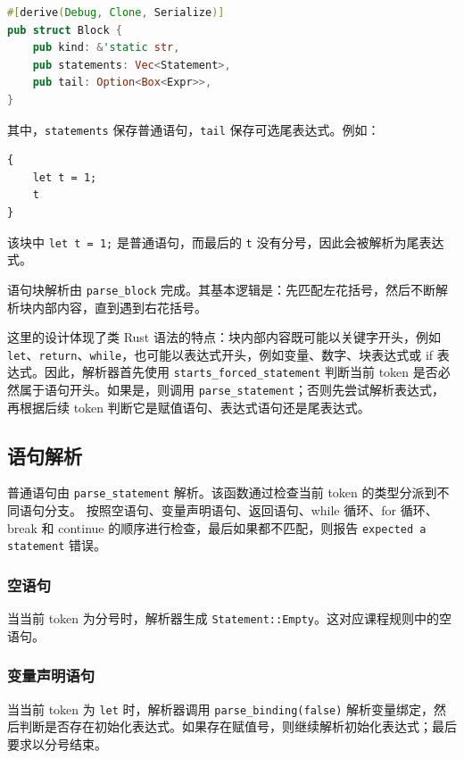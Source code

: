 \documentclass[UTF8,a4paper,12pt]{ctexart}
\begin{document}
\begin{lstlisting}[language=Rust,caption={Block 节点定义}]
#[derive(Debug, Clone, Serialize)]
pub struct Block {
    pub kind: &'static str,
    pub statements: Vec<Statement>,
    pub tail: Option<Box<Expr>>,
}
\end{lstlisting}

其中，\texttt{statements} 保存普通语句，\texttt{tail} 保存可选尾表达式。例如：

\begin{lstlisting}[caption={带尾表达式的语句块}]
{
    let t = 1;
    t
}
\end{lstlisting}

该块中 \texttt{let t = 1;} 是普通语句，而最后的 \texttt{t} 没有分号，因此会被解析为尾表达式。

语句块解析由 \texttt{parse\_block} 完成。其基本逻辑是：先匹配左花括号，然后不断解析块内部内容，直到遇到右花括号。

这里的设计体现了类 Rust 语法的特点：块内部内容既可能以关键字开头，例如 \texttt{let}、\texttt{return}、\texttt{while}，也可能以表达式开头，例如变量、数字、块表达式或 if 表达式。因此，解析器首先使用 \texttt{starts\_forced\_statement} 判断当前 token 是否必然属于语句开头。如果是，则调用 \texttt{parse\_statement}；否则先尝试解析表达式，再根据后续 token 判断它是赋值语句、表达式语句还是尾表达式。

\subsection{语句解析}

普通语句由 \texttt{parse\_statement} 解析。该函数通过检查当前 token 的类型分派到不同语句分支。
按照空语句、变量声明语句、返回语句、while 循环、for 循环、break 和 continue 的顺序进行检查，最后如果都不匹配，则报告 \texttt{expected a statement} 错误。

\subsubsection{空语句}

当当前 token 为分号时，解析器生成 \texttt{Statement::Empty}。这对应课程规则中的空语句。

\subsubsection{变量声明语句}

当当前 token 为 \texttt{let} 时，解析器调用 \texttt{parse\_binding(false)} 解析变量绑定，然后判断是否存在初始化表达式。如果存在赋值号，则继续解析初始化表达式；最后要求以分号结束。
\end{document}
